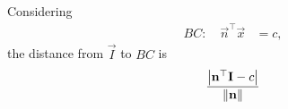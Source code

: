 \solution
Considering
\begin{align}
	BC: \quad \vec{n} ^\top \vec{x} &= c, 
\end{align}
the distance from $\vec{I}$ to $BC$ is 
\begin{align}
\frac{\left\vert\mathbf{n}^\top \mathbf{I} - c\right\vert}{\left\lVert\mathbf{n}\right\rVert} 
\end{align}

